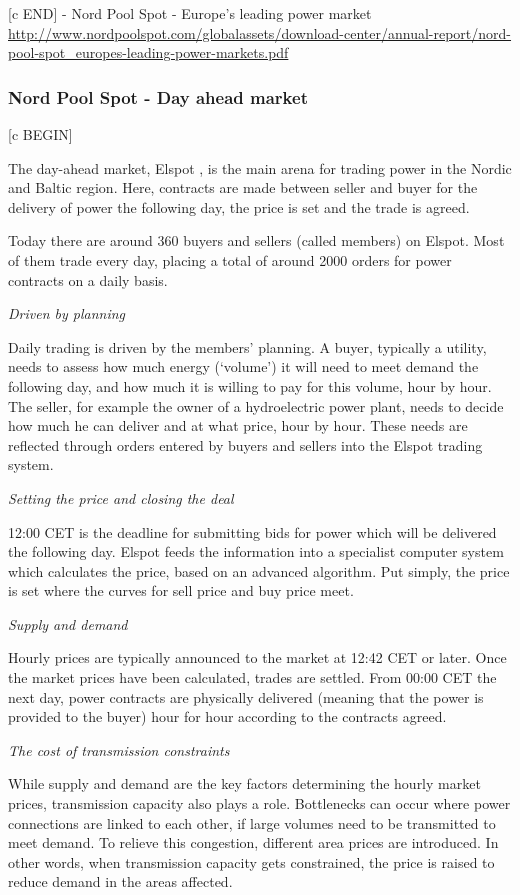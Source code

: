 [c END] - Nord Pool Spot - Europe's leading power market \url{http://www.nordpoolspot.com/globalassets/download-center/annual-report/nord-pool-spot_europes-leading-power-markets.pdf}




\subsubsection{Nord Pool Spot - Day ahead market}

[c BEGIN]

The day-ahead market, Elspot , is the main arena for trading power in the Nordic and Baltic region. Here, contracts are made between seller and buyer for the delivery of power the following day, the price is set and the trade is agreed.

Today there are around 360 buyers and sellers (called members) on Elspot. Most of them trade every day, placing a total of around 2000 orders for power contracts on a daily basis.

\emph{Driven by planning}

Daily trading is driven by the members’ planning. A buyer, typically a utility, needs to assess how much energy (‘volume’) it will need to meet demand the following day, and how much it is willing to pay for this volume, hour by hour. The seller, for example the owner of a hydroelectric power plant, needs to decide how much he can deliver and at what price, hour by hour. These needs are reflected through orders entered by buyers and sellers into the Elspot trading system.

\emph{Setting the price and closing the deal}

12:00 CET is the deadline for submitting bids for power which will be delivered the following day. Elspot feeds the information into a specialist computer system which calculates the price, based on an advanced algorithm. Put simply, the price is set where the curves for sell price and buy price meet.

\emph{Supply and demand}


Hourly prices are typically announced to the market at 12:42 CET or later. Once the market prices have been calculated, trades are settled. From 00:00 CET the next day, power contracts are physically delivered (meaning that the power is provided to the buyer) hour for hour according to the contracts agreed.

\emph{The cost of transmission constraints}

While supply and demand are the key factors determining the hourly market prices, transmission capacity also plays a role. Bottlenecks can occur where power connections are linked to each other, if large volumes need to be transmitted to meet demand. To relieve this congestion, different area prices are introduced. In other words, when transmission capacity gets constrained, the price is raised to reduce demand in the areas affected.

